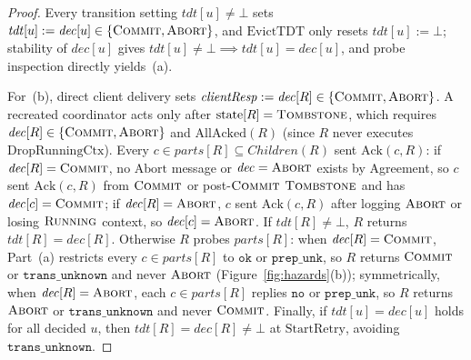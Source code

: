 \documentclass[sigconf,nonacm]{acmart}
\newcommand{\stRun}{\textsc{Running}}
\newcommand{\stCom}{\textsc{Commit}}
\newcommand{\stAbt}{\textsc{Abort}}
\newcommand{\stTomb}{\textsc{Tombstone}}
\newcommand{\Children}{\mathit{Children}}
\newcommand{\parts}{\mathit{parts}}
\newcommand{\tdt}{\mathit{tdt}}
\newcommand{\dec}{\mathit{dec}}
\begin{document}
\begin{proof}
Every transition setting \(\tdt[u] \neq \bot\) sets \(\tdt[u] := \dec[u] \in
\{\stCom,\allowbreak \stAbt\}\), and \(\mathrm{EvictTDT}\) only resets
\(\tdt[u] := \bot\); stability of \(\dec[u]\) gives \(\tdt[u] \neq \bot
\implies \tdt[u] = \dec[u]\), and probe inspection directly yields~(a).

For~(b), direct client delivery sets \(\mathit{clientResp} := \dec[R] \in
\{\stCom,\allowbreak \stAbt\}\). A recreated coordinator acts only after
\(\mathrm{state}[R] = \stTomb\), which requires \(\dec[R] \in
\{\stCom,\allowbreak \stAbt\}\) and \(\mathrm{AllAcked}(R)\) (since \(R\)
never executes \(\mathrm{DropRunningCtx}\)). Every \(c \in \parts[R]
\subseteq \Children(R)\) sent \(\mathrm{Ack}(c, R)\): if \(\dec[R] =
\stCom\), no \(\mathrm{Abort}\) message or \(\dec = \stAbt\) exists by
Agreement, so \(c\) sent \(\mathrm{Ack}(c, R)\) from \(\stCom\) or
post-\(\stCom\) \(\stTomb\) and has \(\dec[c] = \stCom\); if \(\dec[R] =
\stAbt\), \(c\) sent \(\mathrm{Ack}(c, R)\) after logging \(\stAbt\) or
losing \(\stRun\) context, so \(\dec[c] = \stAbt\). If \(\tdt[R] \neq \bot\),
\(R\) returns \(\tdt[R] = \dec[R]\). Otherwise \(R\) probes \(\parts[R]\):
when \(\dec[R] = \stCom\), Part~(a) restricts every \(c \in \parts[R]\) to
\(\mathtt{ok}\) or \(\mathtt{prep\_unk}\), so \(R\) returns \(\stCom\) or
\(\mathtt{trans\_unknown}\) and never \(\stAbt\)
(Figure~\ref{fig:hazards}(b)); symmetrically, when \(\dec[R] = \stAbt\), each
\(c \in \parts[R]\) replies \(\mathtt{no}\) or \(\mathtt{prep\_unk}\), so
\(R\) returns \(\stAbt\) or \(\mathtt{trans\_unknown}\) and never \(\stCom\).
Finally, if \(\tdt[u] = \dec[u]\) holds for all decided \(u\), then
\(\tdt[R] = \dec[R] \neq \bot\) at \(\mathrm{StartRetry}\), avoiding
\(\mathtt{trans\_unknown}\).
\end{proof}
\end{document}

